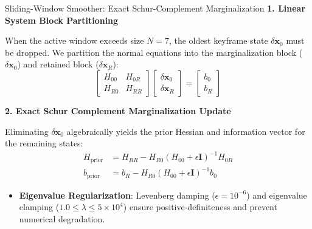 \documentclass[aspectratio=169, 10pt]{beamer}
\begin{document}
\begin{frame}{Sliding-Window Smoother: Exact Schur-Complement Marginalization}
  {\normalsize \textbf{\textcolor{NavyBlue}{1. Linear System Block Partitioning}}}
  \vspace{0.1cm}

  When the active window exceeds size $N=7$, the oldest keyframe state $\delta \mathbf{x}_0$ must be dropped. We partition the normal equations into the marginalization block ($\delta \mathbf{x}_0$) and retained block ($\delta \mathbf{x}_R$):
  \begin{equation}
    \begin{bmatrix} H_{00} & H_{0R} \\ H_{R0} & H_{RR} \end{bmatrix} \begin{bmatrix} \delta \mathbf{x}_0 \\ \delta \mathbf{x}_R \end{bmatrix} = \begin{bmatrix} b_0 \\ b_R \end{bmatrix}
  \end{equation}

  \vspace{0.25cm}
  {\normalsize \textbf{\textcolor{NavyBlue}{2. Exact Schur Complement Marginalization Update}}}
  \vspace{0.1cm}

  Eliminating $\delta \mathbf{x}_0$ algebraically yields the prior Hessian and information vector for the remaining states:
  \begin{align}
    H_{\text{prior}} &= H_{RR} - H_{R0} (H_{00} + \epsilon \mathbf{I})^{-1} H_{0R} \\
    b_{\text{prior}} &= b_R - H_{R0} (H_{00} + \epsilon \mathbf{I})^{-1} b_0
  \end{align}

  \begin{itemize}
    \setlength{\itemsep}{2pt}
    \item \textbf{Eigenvalue Regularization}: Levenberg damping ($\epsilon = 10^{-6}$) and eigenvalue clamping ($1.0 \le \lambda \le 5\times 10^4$) ensure positive-definiteness and prevent numerical degradation.
  \end{itemize}
\end{frame}
\end{document}
